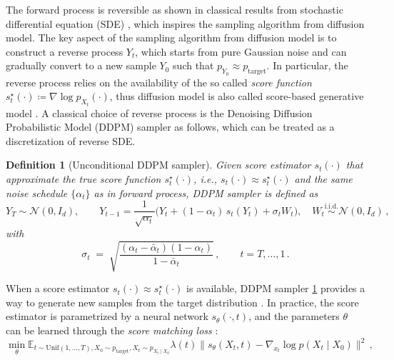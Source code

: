 \documentclass{article}
\newtheorem{definition}{Definition}[section]
\begin{document}
The forward process is reversible as shown in classical results from stochastic differential equation (SDE) \citep{anderson1982reverse}, which inspires the sampling algorithm from diffusion model. 
The key aspect of the sampling algorithm from diffusion model is to construct a reverse process $Y_t$, which starts from pure Gaussian noise and can gradually convert to a new sample $Y_0$ such that $p_{Y_0} \approx p_{\text{target}}$. In particular, the reverse process relies on the availability of the so called \emph{score function} $s_t^\star(\cdot)\coloneqq \nabla\log p_{X_t}(\cdot)$, thus diffusion model is also called score-based generative model \cite{song2020score}. A classical choice of reverse process is the Denoising Diffusion Probabilistic Model (DDPM) \citep{ho2020denoising} sampler as follows, which can be treated as a discretization of reverse SDE. 
\begin{definition}[Unconditional DDPM sampler]\label{def:ddpm}
Given score estimator $s_t(\cdot)$ that approximate the true score function $s_t^{\star}(\cdot)$, i.e., $s_t(\cdot) \approx s_t^{\star}(\cdot)$ and the same noise schedule $\{\alpha_t\}$ as in forward process, DDPM sampler is defined as
\begin{equation}
Y_T\sim\mathcal N(0,I_d),\qquad
Y_{t-1}
=\frac{1}{\sqrt{\alpha_t}}\Big(Y_t+(1-\alpha_t)\,s_t(Y_t)+\sigma_t W_t\Big),
\quad W_t\stackrel{\text{i.i.d.}}{\sim}\mathcal N(0,I_d)\,,
\end{equation}
with
\begin{equation}
\sigma_t
\;=\;\sqrt{\frac{(\alpha_t-\bar{\alpha}_t)(1-\alpha_t)}{1-\bar{\alpha}_t}}\,,\qquad t=T,\ldots,1\,.
\end{equation}
\end{definition}
When a score estimator $s_t(\cdot) \approx s_t^\star(\cdot)$ is available, DDPM sampler \ref{def:ddpm} provides a way to generate new samples from the target distribution \citep{ho2020denoising}. In practice, the score estimator is parametrized by a neural network $s_{\theta}(\cdot, t)$, and the parameters $\theta$ can be learned through the \emph{score matching loss} \citep{ho2020denoising, song2020score, vincent2011connection}:
\begin{equation}
\label{eq:score-matching} 
    \min_{\theta} \mathbb{E}_{t \sim \mathrm{Unif}{(1,\dots,T)}, X_0 \sim p_{\text{target}}, X_t \sim p_{X_t \mid X_0}} \lambda(t)\| s_{\theta}(X_t,t) - \nabla_{x_t} \log p(X_t \mid X_0) \|^2\,,
\end{equation}
\end{document}
